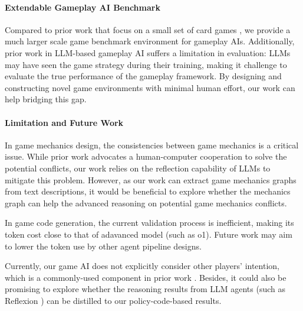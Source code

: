 \paragraph{Extendable Gameplay AI Benchmark}
Compared to prior work that focus on a small set of card games \cite{costarelli2024gamebench,zha_douzero_2021}, we provide a much larger scale game benchmark environment for gameplay AIs. 
Additionally, prior work in LLM-based gameplay AI suffers a limitation in evaluation: LLMs may have seen the game strategy during their training, making it challenge to evaluate the true performance of the gameplay framework. By designing and constructing novel game environments with minimal human effort, our work can help bridging this gap.

\paragraph{Limitation and Future Work}

In game mechanics design, the consistencies between game mechanics is a critical issue. While prior work \cite{pitako} advocates a human-computer cooperation to solve the potential conflicts, our work relies on the reflection capability of LLMs to mitigate this problem. However, as our work can extract game mechanics graphs from text descriptions, it would be beneficial to explore whether the mechanics graph can help the advanced reasoning on potential game mechanics conflicts.

In game code generation, the current validation process is inefficient, making its token cost close to that of adavanced model (such as o1). Future work may aim to lower the token use by other agent pipeline designs.

Currently, our game AI does not explicitly consider other players' intention, which is a commonly-used component in prior work \cite{zhang2024agentpro,guo_suspicion-agent_2023}. Besides, it could also be promising to explore whether the reasoning results from LLM agents (such as Reflexion \cite{shinn_reflexion_2023}) can be distilled to our policy-code-based results.